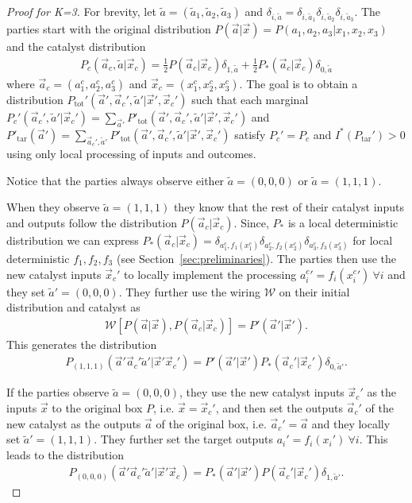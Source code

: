 \documentclass[pra,aps,reprint,superscriptaddress]{revtex4-2}
\theoremstyle{theorem}
\begin{document}
\begin{proof}[Proof for K=3] For brevity, let $\tilde a = (\tilde a_1, \tilde a_2, \tilde a_3)$ and $\delta_{i,\tilde a} = \delta_{i,\tilde a_1}\delta_{i,\tilde a_2}\delta_{i,\tilde a_3}$. The parties start with the original distribution $P(\vec a|\vec x)=P(a_1,a_2,a_3|x_1,x_2,x_3)$ and the catalyst distribution
\begin{align}
    P_c(\vec a_c,\tilde a|\vec x_c) = \frac{1}{2}P(\vec a_c|\vec x_c)\delta_{1,\tilde a} + \frac{1}{2}P_*(\vec a_c| \vec x_c)\delta_{0,\tilde a}
\end{align}
where $\vec a_c = (a_1^c,a_2^c,a_3^c)$ and $\vec x_c = (x_1^c,x_2^c,x_3^c)$. The goal is to obtain a distribution $P_{\mathrm{tot}}'(\vec a',\vec a_c',\tilde a'|\vec x',\vec x_c')$ such that each marginal $P_c'(\vec a_c',\tilde a'|\vec x_c')=\sum_{\vec a'}P'_{\mathrm{tot}}(\vec a',\vec a_c',\tilde a'|\vec x',\vec x_c')$ and $P'_{\mathrm{tar}}(\vec a')=\sum_{\vec a_c',\tilde a'}P'_{\mathrm{tot}}(\vec a',\vec a_c',\tilde a'|\vec x',\vec x_c')$ satisfy $P_c' = P_c$ and $I^*(P_{\mathrm{tar}}')>0$ using only local processing of inputs and outcomes.

Notice that the parties always observe either $\tilde a = (0,0,0)$ or $\tilde a = (1,1,1)$. 

When they observe $\tilde a = (1,1,1)$ they know that the rest of their catalyst inputs and outputs follow the distribution $P(\vec a_c | \vec x_c)$. Since, $P_*$ is a local deterministic distribution we can express $P_*(\vec a_c|\vec x_c) = \delta_{a_1^c,f_1(x_1^c)} \delta_{a_2^c,f_2(x_2^c)} \delta_{a_3^c,f_3(x_3^c)}$ for local deterministic $f_1,f_2,f_3$ (see Section~\ref{sec:preliminaries}). The parties then use the new catalyst inputs $\vec x_c'$ to locally implement the processing ${a_i^c}'=f_i({x_i^c}') \ \forall i$ and they set $\tilde a'= (0,0,0)$. They further use the wiring $\mathcal{W}$ on their initial distribution and catalyst as
\begin{align}
\mathcal{W}\left[P(\vec a|\vec x),P(\vec a_c|\vec x_c)\right] = P'(\vec a'|\vec x').
\end{align}
 This generates the distribution
\begin{align}
    P_{(1,1,1)}(\vec a' \vec a_c' \tilde a' | \vec x' \vec x_c')= P'(\vec a'|\vec x') P_*(\vec a_c' | \vec x_c ') \delta_{0,\tilde a'} . 
\end{align}


If the parties observe $\tilde a = (0,0,0)$, they use the new catalyst inputs $\vec x_c'$ as the inputs $\vec x $ to the original box $P$, i.e. $\vec x = \vec x_c'$, and then set the outputs $\vec a_c'$ of the new catalyst as the outputs $\vec a$ of the original box, i.e. $\vec a_c' = \vec a$ and they locally set $\tilde a' = (1,1,1)$. They further set the target outputs ${a_i}'=f_i({x_i}') \ \forall i$. This leads to the distribution
\begin{align}
    P_{(0,0,0)}(\vec a' \vec a_c' \tilde a' | \vec x' \vec x_c)= P_*(\vec a'|\vec x') P(\vec a_c'|\vec x_c') \delta_{1,\tilde a'} . 
\end{align}


\end{proof}
\end{document}
